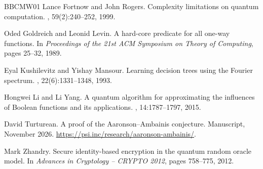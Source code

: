 \documentclass[11pt]{article}
\theoremstyle{remark}
\begin{document}
\begin{thebibliography}{BBCMW01}
Lance Fortnow and John Rogers.
\newblock Complexity limitations on quantum computation.
, 59(2):240--252, 1999.

Oded Goldreich and Leonid Levin.
\newblock A hard-core predicate for all one-way functions.
\newblock In {\em Proceedings of the 21st ACM Symposium on Theory of Computing}, pages
  25--32, 1989.

Eyal Kushilevitz and Yishay Mansour.
\newblock Learning decision trees using the {Fourier} spectrum.
, 22(6):1331--1348, 1993.

Hongwei Li and Li Yang.
\newblock A quantum algorithm for approximating the influences of {Boolean}
  functions and its applications.
, 14:1787--1797, 2015.

David Turturean.
\newblock A proof of the {Aaronson--Ambainis} conjecture.
\newblock Manuscript, November 2026.
\newblock \url{https://psi.inc/research/aaronson-ambainis/}.

Mark Zhandry.
\newblock Secure identity-based encryption in the quantum random oracle model.
\newblock In {\em Advances in Cryptology -- CRYPTO 2012}, pages 758--775, 2012.

\end{thebibliography}
\end{document}
